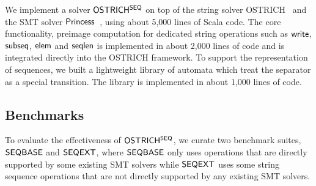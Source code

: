 
We implement a solver  ${\sf OSTRICH^{SEQ}}$ on top of the string solver OSTRICH~\cite{CHL+19} and the SMT solver ${\sf Princess}$~\cite{princess08}, using about 5,000 lines of Scala code. The core functionality, preimage computation for dedicated string operations such as $\mathsf{write}$, ${\sf subseq}$, ${\sf elem}$ and $\mathsf{seqlen}$ is implemented in about 2,000 lines of code and is integrated directly into the OSTRICH framework. To support the representation of sequences, we built a lightweight library of automata which treat the separator as a special transition. The library is implemented in about 1,000 lines of code. 




\subsection{Benchmarks}

To evaluate the effectiveness of ${\sf OSTRICH^{SEQ}}$, we curate two benchmark suites, ${\sf SEQBASE}$ and ${\sf SEQEXT}$,
where ${\sf SEQBASE}$ only uses operations that are directly supported by some existing SMT solvers while ${\sf SEQEXT}$ uses some string sequence operations that are not directly supported by any existing SMT solvers.

